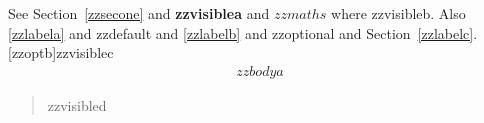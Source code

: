 \newcommand{\secref}[1]{Section~\ref{#1}}
\newcommand{\todo}[1]{\textbf{#1}}
\newcommand{\eqn}[2]{$#1$ where #2}
\newcommand{\opt}[2][zzdefault]{\ref{#2} and #1}
\newcommand\both[1]{\secref{#1}}
\def\lbl#1{\label{#1}}
\newenvironment{eqnarray2}{\begin{align}}{\end{align}}
\newenvironment{plain}{\begin{quote}}{\end{quote}}

See \secref{zzsecone} and \todo{zzvisiblea} and \eqn{zzmaths}{zzvisibleb}.
Also \opt{zzlabela} and \opt[zzoptional]{zzlabelb} and \both{zzlabelc}.
\lbl{zzlabeld} [zzoptb]{zzvisiblec}
\begin{eqnarray2} zzbodya \end{eqnarray2}
\begin{plain} zzvisibled \end{plain}

